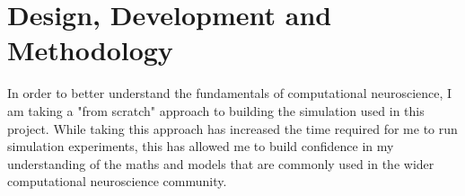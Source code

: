 \chapter{Design, Development and Methodology}


In order to better understand the fundamentals of computational neuroscience, I
am taking a "from scratch" approach to building the simulation used in this
project. While taking this approach has increased the time required for me to run simulation experiments, this has allowed me to build confidence in my
understanding of the maths and models that are commonly used in the wider
computational neuroscience community.




